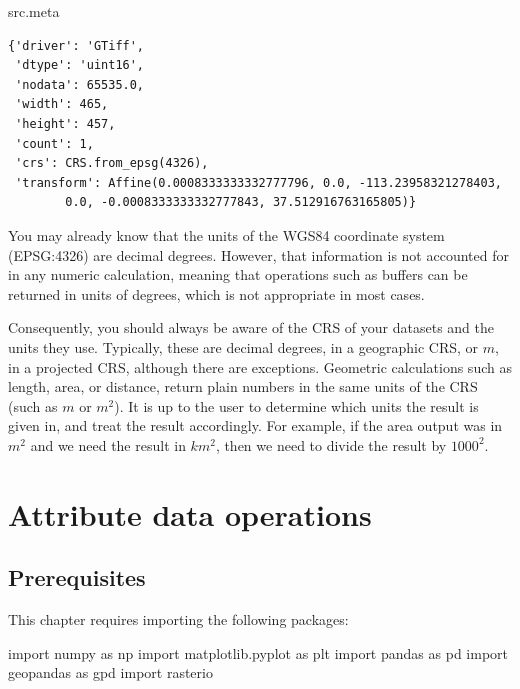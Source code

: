 \documentclass[
  letterpaper,
]{krantz}
\newenvironment{Shaded}{\begin{snugshade}}{\end{snugshade}}
\newcommand{\ImportTok}[1]{\textcolor[rgb]{0.00,0.46,0.62}{#1}}
\newcommand{\NormalTok}[1]{\textcolor[rgb]{0.00,0.23,0.31}{#1}}
\begin{document}
\begin{Shaded}
\begin{Highlighting}[]
\NormalTok{src.meta}
\end{Highlighting}
\end{Shaded}

\begin{verbatim}
{'driver': 'GTiff',
 'dtype': 'uint16',
 'nodata': 65535.0,
 'width': 465,
 'height': 457,
 'count': 1,
 'crs': CRS.from_epsg(4326),
 'transform': Affine(0.0008333333332777796, 0.0, -113.23958321278403,
        0.0, -0.0008333333332777843, 37.512916763165805)}
\end{verbatim}

You may already know that the units of the WGS84 coordinate system
(EPSG:4326) are decimal degrees. However, that information is not
accounted for in any numeric calculation, meaning that operations such
as buffers can be returned in units of degrees, which is not appropriate
in most cases.

Consequently, you should always be aware of the CRS of your datasets and
the units they use. Typically, these are decimal degrees, in a
geographic CRS, or \(m\), in a projected CRS, although there are
exceptions. Geometric calculations such as length, area, or distance,
return plain numbers in the same units of the CRS (such as \(m\) or
\(m^2\)). It is up to the user to determine which units the result is
given in, and treat the result accordingly. For example, if the area
output was in \(m^2\) and we need the result in \(km^2\), then we need
to divide the result by \(1000^2\).


\chapter{Attribute data operations}\label{sec-attr}

\section*{Prerequisites}\label{prerequisites-1}


This chapter requires importing the following packages:

\begin{Shaded}
\begin{Highlighting}[]
\ImportTok{import}\NormalTok{ numpy }\ImportTok{as}\NormalTok{ np}
\ImportTok{import}\NormalTok{ matplotlib.pyplot }\ImportTok{as}\NormalTok{ plt}
\ImportTok{import}\NormalTok{ pandas }\ImportTok{as}\NormalTok{ pd}
\ImportTok{import}\NormalTok{ geopandas }\ImportTok{as}\NormalTok{ gpd}
\ImportTok{import}\NormalTok{ rasterio}
\end{Highlighting}
\end{Shaded}
\end{document}
